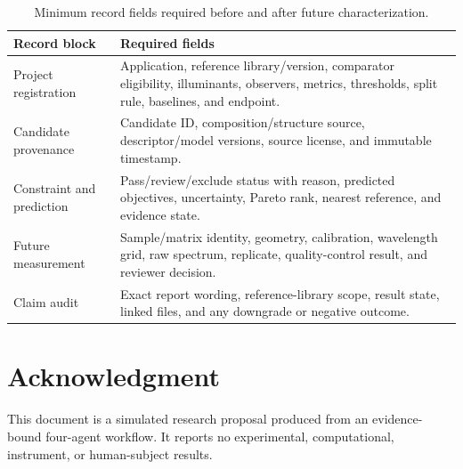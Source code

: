 \documentclass[conference]{IEEEtran}
\begin{document}
\begin{table}[!t]
\caption{Minimum record fields required before and after future characterization.}
\label{tab:record-contract}
\centering
\renewcommand{\arraystretch}{1.15}
\begin{tabular}{|P{0.28\columnwidth}|P{0.55\columnwidth}|}
\hline
\textbf{Record block} & \textbf{Required fields} \\
\hline
Project registration & Application, reference library/version, comparator eligibility, illuminants, observers, metrics, thresholds, split rule, baselines, and endpoint. \\
\hline
Candidate provenance & Candidate ID, composition/structure source, descriptor/model versions, source license, and immutable timestamp. \\
\hline
Constraint and prediction & Pass/review/exclude status with reason, predicted objectives, uncertainty, Pareto rank, nearest reference, and evidence state. \\
\hline
Future measurement & Sample/matrix identity, geometry, calibration, wavelength grid, raw spectrum, replicate, quality-control result, and reviewer decision. \\
\hline
Claim audit & Exact report wording, reference-library scope, result state, linked files, and any downgrade or negative outcome. \\
\hline
\end{tabular}
\end{table}

\section*{Acknowledgment}

This document is a simulated research proposal produced from an evidence-bound four-agent workflow. It reports no experimental, computational, instrument, or human-subject results.
\end{document}
